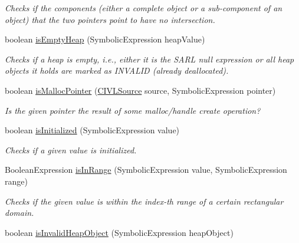 \begin{DoxyCompactItemize}
\begin{DoxyCompactList}\small\item\em Checks if the components (either a complete object or a sub-\/component of an object) that the two pointers point to have no intersection. \end{DoxyCompactList}\item 
boolean \hyperlink{interfaceedu_1_1udel_1_1cis_1_1vsl_1_1civl_1_1dynamic_1_1IF_1_1SymbolicUtility_ad1bb0169544fe21280f7159a8ed00fb6}{is\+Empty\+Heap} (Symbolic\+Expression heap\+Value)
\begin{DoxyCompactList}\small\item\em Checks if a heap is empty, i.\+e., either it is the S\+A\+R\+L null expression or all heap objects it holds are marked as I\+N\+V\+A\+L\+I\+D (already deallocated). \end{DoxyCompactList}\item 
boolean \hyperlink{interfaceedu_1_1udel_1_1cis_1_1vsl_1_1civl_1_1dynamic_1_1IF_1_1SymbolicUtility_ab7d04bcc71c1672fbac5f5a284c367eb}{is\+Malloc\+Pointer} (\hyperlink{interfaceedu_1_1udel_1_1cis_1_1vsl_1_1civl_1_1model_1_1IF_1_1CIVLSource}{C\+I\+V\+L\+Source} source, Symbolic\+Expression pointer)
\begin{DoxyCompactList}\small\item\em Is the given pointer the result of some malloc/handle create operation? \end{DoxyCompactList}\item 
boolean \hyperlink{interfaceedu_1_1udel_1_1cis_1_1vsl_1_1civl_1_1dynamic_1_1IF_1_1SymbolicUtility_ac742c32f54173267e148d4d9467eb462}{is\+Initialized} (Symbolic\+Expression value)
\begin{DoxyCompactList}\small\item\em Checks if a given value is initialized. \end{DoxyCompactList}\item 
Boolean\+Expression \hyperlink{interfaceedu_1_1udel_1_1cis_1_1vsl_1_1civl_1_1dynamic_1_1IF_1_1SymbolicUtility_a03af7646291d90162209d9e0a6484758}{is\+In\+Range} (Symbolic\+Expression value, Symbolic\+Expression range)
\begin{DoxyCompactList}\small\item\em Checks if the given value is within the index-\/th range of a certain rectangular domain. \end{DoxyCompactList}\item 
boolean \hyperlink{interfaceedu_1_1udel_1_1cis_1_1vsl_1_1civl_1_1dynamic_1_1IF_1_1SymbolicUtility_a500bf2359a189ffe2a8d8d8eb9f2dee2}{is\+Invalid\+Heap\+Object} (Symbolic\+Expression heap\+Object)

\end{DoxyCompactItemize}
